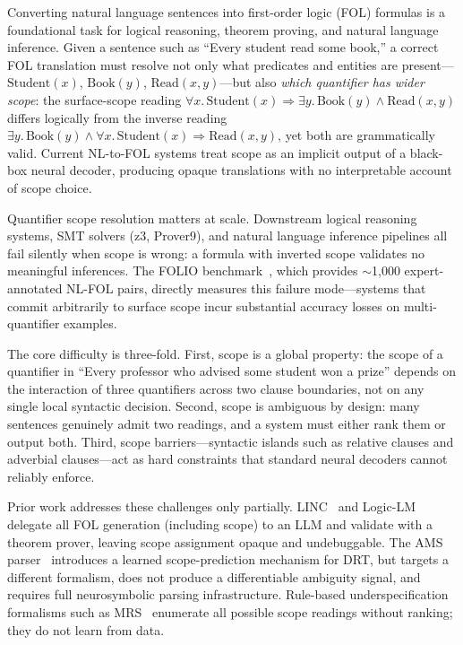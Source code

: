 \documentclass[11pt,letterpaper]{article}
\begin{document}
Converting natural language sentences into first-order logic (FOL) formulas is a foundational task for logical
reasoning, theorem proving, and natural language inference. Given a sentence such as ``Every student read some
book,'' a correct FOL translation must resolve not only what predicates and entities are
present---$\text{Student}(x)$, $\text{Book}(y)$, $\text{Read}(x,y)$---but also \emph{which quantifier has wider
scope}: the surface-scope reading $\forall x.\, \text{Student}(x) \Rightarrow \exists y.\, \text{Book}(y) \wedge
\text{Read}(x,y)$ differs logically from the inverse reading $\exists y.\, \text{Book}(y) \wedge \forall x.\,
\text{Student}(x) \Rightarrow \text{Read}(x,y)$, yet both are grammatically valid. Current NL-to-FOL systems
\citep{Olausson2023,Thatikonda2024} treat scope as an implicit output of a black-box neural decoder, producing
opaque translations with no interpretable account of scope choice.

Quantifier scope resolution matters at scale. Downstream logical reasoning systems, SMT solvers (z3, Prover9),
and natural language inference pipelines all fail silently when scope is wrong: a formula with inverted scope
validates no meaningful inferences. The FOLIO benchmark~\citep{Han2022}, which provides $\sim$1,000
expert-annotated NL-FOL pairs, directly measures this failure mode---systems that commit arbitrarily to surface
scope incur substantial accuracy losses on multi-quantifier examples.

The core difficulty is three-fold. First, scope is a global property: the scope of a quantifier in ``Every
professor who advised some student won a prize'' depends on the interaction of three quantifiers across two clause
boundaries, not on any single local syntactic decision. Second, scope is ambiguous by design: many sentences
genuinely admit two readings, and a system must either rank them or output both. Third, scope barriers---syntactic
islands such as relative clauses and adverbial clauses---act as hard constraints that standard neural decoders
cannot reliably enforce.

Prior work addresses these challenges only partially. LINC~\citep{Olausson2023} and
Logic-LM~\citep{Pan2023} delegate all FOL generation (including scope) to an LLM and validate with a theorem
prover, leaving scope assignment opaque and undebuggable. The AMS parser~\citep{Yang2024} introduces a learned
scope-prediction mechanism for DRT, but targets a different formalism, does not produce a differentiable
ambiguity signal, and requires full neurosymbolic parsing infrastructure. Rule-based underspecification
formalisms such as MRS~\citep{Copestake2005} enumerate all possible scope readings without ranking; they do not
learn from data.
\end{document}
